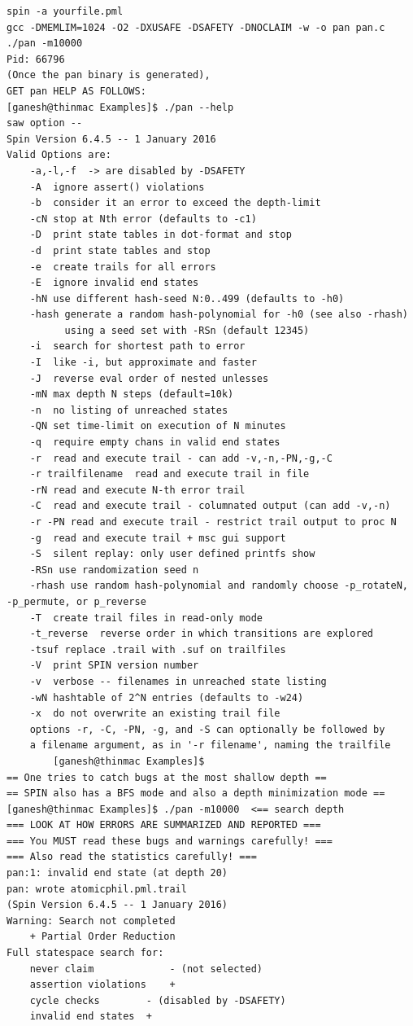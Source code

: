 \documentclass[10pt]{article}
\begin{document}
\begin{scriptsize}
\begin{verbatim}
spin -a yourfile.pml
gcc -DMEMLIM=1024 -O2 -DXUSAFE -DSAFETY -DNOCLAIM -w -o pan pan.c
./pan -m10000 
Pid: 66796
(Once the pan binary is generated),
GET pan HELP AS FOLLOWS:
[ganesh@thinmac Examples]$ ./pan --help
saw option --
Spin Version 6.4.5 -- 1 January 2016
Valid Options are:
	-a,-l,-f  -> are disabled by -DSAFETY
	-A  ignore assert() violations
	-b  consider it an error to exceed the depth-limit
	-cN stop at Nth error (defaults to -c1)
	-D  print state tables in dot-format and stop
	-d  print state tables and stop
	-e  create trails for all errors
	-E  ignore invalid end states
	-hN use different hash-seed N:0..499 (defaults to -h0)
	-hash generate a random hash-polynomial for -h0 (see also -rhash)
	      using a seed set with -RSn (default 12345)
	-i  search for shortest path to error
	-I  like -i, but approximate and faster
	-J  reverse eval order of nested unlesses
	-mN max depth N steps (default=10k)
	-n  no listing of unreached states
	-QN set time-limit on execution of N minutes
	-q  require empty chans in valid end states
	-r  read and execute trail - can add -v,-n,-PN,-g,-C
	-r trailfilename  read and execute trail in file
	-rN read and execute N-th error trail
	-C  read and execute trail - columnated output (can add -v,-n)
	-r -PN read and execute trail - restrict trail output to proc N
	-g  read and execute trail + msc gui support
	-S  silent replay: only user defined printfs show
	-RSn use randomization seed n
	-rhash use random hash-polynomial and randomly choose -p_rotateN, -p_permute, or p_reverse
	-T  create trail files in read-only mode
	-t_reverse  reverse order in which transitions are explored
	-tsuf replace .trail with .suf on trailfiles
	-V  print SPIN version number
	-v  verbose -- filenames in unreached state listing
	-wN hashtable of 2^N entries (defaults to -w24)
	-x  do not overwrite an existing trail file
	options -r, -C, -PN, -g, and -S can optionally be followed by
	a filename argument, as in '-r filename', naming the trailfile
        [ganesh@thinmac Examples]$
== One tries to catch bugs at the most shallow depth ==
== SPIN also has a BFS mode and also a depth minimization mode ==
[ganesh@thinmac Examples]$ ./pan -m10000  <== search depth 
=== LOOK AT HOW ERRORS ARE SUMMARIZED AND REPORTED ===
=== You MUST read these bugs and warnings carefully! ===
=== Also read the statistics carefully! ===
pan:1: invalid end state (at depth 20)
pan: wrote atomicphil.pml.trail
(Spin Version 6.4.5 -- 1 January 2016)
Warning: Search not completed
	+ Partial Order Reduction
Full statespace search for:
	never claim         	- (not selected)         
	assertion violations	+                        
	cycle checks       	- (disabled by -DSAFETY) 
	invalid end states	+                        
 

\end{verbatim}
\end{scriptsize}
\end{document}
